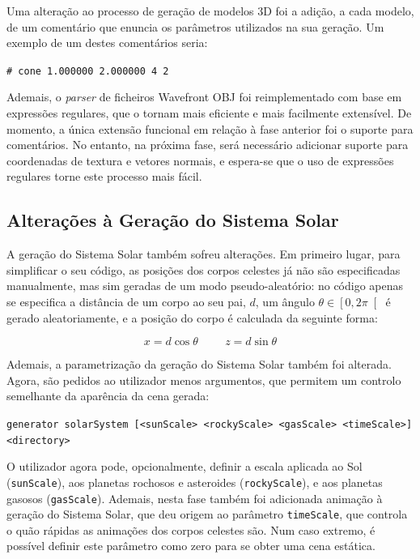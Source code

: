 \documentclass[12pt, a4paper]{article}
\begin{document}
Uma alteração ao processo de geração de modelos 3D foi a adição, a cada modelo, de um comentário que
enuncia os parâmetros utilizados na sua geração. Um exemplo de um destes comentários seria:

\begin{center}
\texttt{\# cone 1.000000 2.000000 4 2}
\end{center}

Ademais, o \emph{parser} de ficheiros Wavefront OBJ foi reimplementado com base em expressões
regulares, que o tornam mais eficiente e mais facilmente extensível. De momento, a única extensão
funcional em relação à fase anterior foi o suporte para comentários. No entanto, na próxima fase,
será necessário adicionar suporte para coordenadas de textura e vetores normais, e espera-se que o
uso de expressões regulares torne este processo mais fácil.

\subsection{Alterações à Geração do Sistema Solar}

A geração do Sistema Solar também sofreu alterações. Em primeiro lugar, para simplificar o seu
código, as posições dos corpos celestes já não são especificadas manualmente, mas sim geradas de um
modo pseudo-aleatório: no código apenas se especifica a distância de um corpo ao seu pai, $d$, um
ângulo $\theta \in \left [ 0, 2\pi \right [$ é gerado aleatoriamente, e a posição do corpo é
calculada da seguinte forma:

$$
x = d \cos \theta
\hspace{1cm}
z = d \sin \theta
$$

Ademais, a parametrização da geração do Sistema Solar também foi alterada. Agora, são pedidos ao
utilizador menos argumentos, que permitem um controlo semelhante da aparência da cena gerada:

\begin{center}
\small
\texttt{generator solarSystem [<sunScale> <rockyScale> <gasScale> <timeScale>] <directory>}
\end{center}

O utilizador agora pode, opcionalmente, definir a escala aplicada ao Sol (\texttt{sunScale}), aos
planetas rochosos e asteroides (\texttt{rockyScale}), e aos planetas gasosos (\texttt{gasScale}).
Ademais, nesta fase também foi adicionada animação à geração do Sistema Solar, que deu origem ao
parâmetro \texttt{timeScale}, que controla o quão rápidas as animações dos corpos celestes são. Num
caso extremo, é possível definir este parâmetro como zero para se obter uma cena estática.
\end{document}
